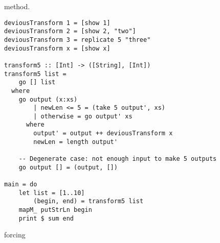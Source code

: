 method.
% 
\begin{lstlisting}
deviousTransform 1 = [show 1]
deviousTransform 2 = [show 2, "two"]
deviousTransform 3 = replicate 5 "three"
deviousTransform x = [show x]

transform5 :: [Int] -> ([String], [Int])
transform5 list =
    go [] list
  where
    go output (x:xs)
        | newLen <= 5 = (take 5 output', xs)
        | otherwise = go output' xs
      where
        output' = output ++ deviousTransform x
        newLen = length output'

    -- Degenerate case: not enough input to make 5 outputs
    go output [] = (output, [])

main = do
    let list = [1..10]
        (begin, end) = transform5 list
    mapM_ putStrLn begin
    print $ sum end
\end{lstlisting}    
% 
% 
forcing
% 
% 
% 
